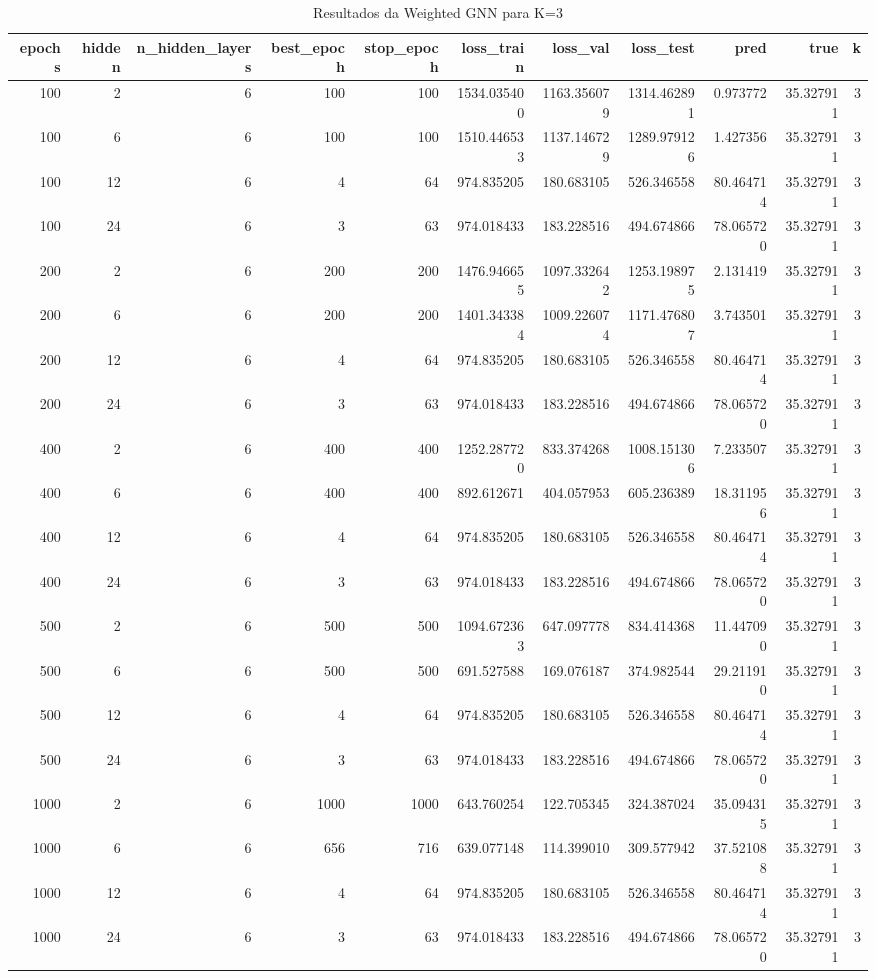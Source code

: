 \begin{table}
\caption{Resultados da Weighted GNN para K=3}
\label{tab:weighted_gnn_results_k3}
\begin{tabular}{rrrrrrrrrrr}
\toprule
epochs & hidden & n\_hidden\_layers & best\_epoch & stop\_epoch & loss\_train & loss\_val & loss\_test & pred & true & k \\
\midrule
100 & 2 & 6 & 100 & 100 & 1534.035400 & 1163.356079 & 1314.462891 & 0.973772 & 35.327911 & 3 \\
100 & 6 & 6 & 100 & 100 & 1510.446533 & 1137.146729 & 1289.979126 & 1.427356 & 35.327911 & 3 \\
100 & 12 & 6 & 4 & 64 & 974.835205 & 180.683105 & 526.346558 & 80.464714 & 35.327911 & 3 \\
100 & 24 & 6 & 3 & 63 & 974.018433 & 183.228516 & 494.674866 & 78.065720 & 35.327911 & 3 \\
200 & 2 & 6 & 200 & 200 & 1476.946655 & 1097.332642 & 1253.198975 & 2.131419 & 35.327911 & 3 \\
200 & 6 & 6 & 200 & 200 & 1401.343384 & 1009.226074 & 1171.476807 & 3.743501 & 35.327911 & 3 \\
200 & 12 & 6 & 4 & 64 & 974.835205 & 180.683105 & 526.346558 & 80.464714 & 35.327911 & 3 \\
200 & 24 & 6 & 3 & 63 & 974.018433 & 183.228516 & 494.674866 & 78.065720 & 35.327911 & 3 \\
400 & 2 & 6 & 400 & 400 & 1252.287720 & 833.374268 & 1008.151306 & 7.233507 & 35.327911 & 3 \\
400 & 6 & 6 & 400 & 400 & 892.612671 & 404.057953 & 605.236389 & 18.311956 & 35.327911 & 3 \\
400 & 12 & 6 & 4 & 64 & 974.835205 & 180.683105 & 526.346558 & 80.464714 & 35.327911 & 3 \\
400 & 24 & 6 & 3 & 63 & 974.018433 & 183.228516 & 494.674866 & 78.065720 & 35.327911 & 3 \\
500 & 2 & 6 & 500 & 500 & 1094.672363 & 647.097778 & 834.414368 & 11.447090 & 35.327911 & 3 \\
500 & 6 & 6 & 500 & 500 & 691.527588 & 169.076187 & 374.982544 & 29.211910 & 35.327911 & 3 \\
500 & 12 & 6 & 4 & 64 & 974.835205 & 180.683105 & 526.346558 & 80.464714 & 35.327911 & 3 \\
500 & 24 & 6 & 3 & 63 & 974.018433 & 183.228516 & 494.674866 & 78.065720 & 35.327911 & 3 \\
1000 & 2 & 6 & 1000 & 1000 & 643.760254 & 122.705345 & 324.387024 & 35.094315 & 35.327911 & 3 \\
1000 & 6 & 6 & 656 & 716 & 639.077148 & 114.399010 & 309.577942 & 37.521088 & 35.327911 & 3 \\
1000 & 12 & 6 & 4 & 64 & 974.835205 & 180.683105 & 526.346558 & 80.464714 & 35.327911 & 3 \\
1000 & 24 & 6 & 3 & 63 & 974.018433 & 183.228516 & 494.674866 & 78.065720 & 35.327911 & 3 \\
\bottomrule
\end{tabular}
\end{table}

